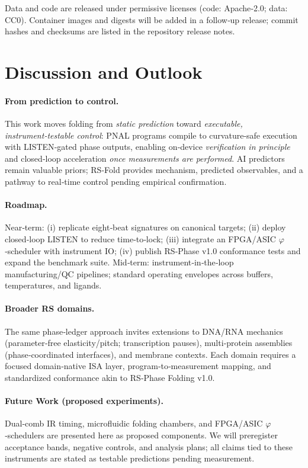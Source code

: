 \documentclass[12pt,a4paper]{article}
\begin{document}
Data and code are released under permissive licenses (code: Apache‑2.0; data: CC0). Container images and digests will be added in a follow‑up release; commit hashes and checksums are listed in the repository release notes.


\section{Discussion and Outlook}

\paragraph{From prediction to control.}
This work moves folding from \emph{static prediction} toward \emph{executable, instrument‑testable control}: PNAL programs compile to curvature‑safe execution with LISTEN‑gated phase outputs, enabling on‑device \emph{verification in principle} and closed‑loop acceleration \emph{once measurements are performed}. AI predictors remain valuable priors; RS‑Fold provides mechanism, predicted observables, and a pathway to real‑time control pending empirical confirmation.

\paragraph{Roadmap.}
Near‑term: (i) replicate eight‑beat signatures on canonical targets; (ii) deploy closed‑loop LISTEN to reduce time‑to‑lock; (iii) integrate an FPGA/ASIC $\varphi$‑scheduler with instrument IO; (iv) publish RS‑Phase v1.0 conformance tests and expand the benchmark suite. Mid‑term: instrument‑in‑the‑loop manufacturing/QC pipelines; standard operating envelopes across buffers, temperatures, and ligands.

\paragraph{Broader RS domains.}
The same phase‑ledger approach invites extensions to DNA/RNA mechanics (parameter‑free elasticity/pitch; transcription pauses), multi‑protein assemblies (phase‑coordinated interfaces), and membrane contexts. Each domain requires a focused domain‑native ISA layer, program‑to‑measurement mapping, and standardized conformance akin to RS‑Phase Folding v1.0.

\paragraph{Future Work (proposed experiments).}
Dual‑comb IR timing, microfluidic folding chambers, and FPGA/ASIC $\varphi$‑schedulers are presented here as proposed components. We will preregister acceptance bands, negative controls, and analysis plans; all claims tied to these instruments are stated as testable predictions pending measurement.
\end{document}
